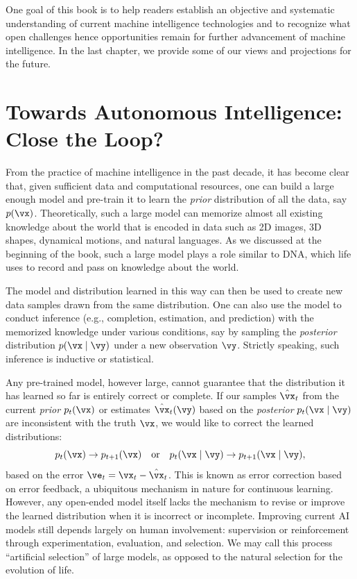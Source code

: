 \documentclass[../../book-main.tex]{subfiles}
\begin{document}
One goal of this book is to help readers establish an objective and
systematic understanding of current machine intelligence technologies
and to recognize what open challenges hence opportunities remain for further
advancement of machine intelligence. In the last chapter, we provide
some of our views and projections for the future.

\section{Towards Autonomous Intelligence: Close the Loop?}
From the practice of machine intelligence in the past decade, it has
become clear that, given sufficient data and computational resources,
one can build a large enough model and pre-train it to learn the
\textit{prior} distribution of all the data, say \(p(\vx)\).
Theoretically, such a large model can memorize almost all existing
knowledge about the world that is encoded in data such as 2D images,
3D shapes, dynamical motions, and natural languages. As we discussed
at the beginning of the book, such a large model plays a role similar
to DNA, which life uses to record and pass on knowledge about the world.

The model and distribution learned in this way can then be used to
create new data samples drawn from the same distribution. One can
also use the model to conduct inference (e.g., completion,
estimation, and prediction) with the memorized knowledge under
various conditions, say by sampling the \textit{posterior}
distribution \(p(\vx\mid \vy)\) under a new observation \(\vy\).
Strictly speaking, such inference is inductive or statistical.

Any pre-trained model, however large, cannot guarantee that the
distribution it has learned so far is entirely correct or complete.
If our samples \(\hat{\vx}_{t}\) from the current \textit{prior}
\(p_{t}(\vx)\) or estimates \(\hat{\vx}_{t}(\vy)\) based on the
\textit{posterior} \(p_{t}(\vx\mid \vy)\) are inconsistent with the
truth \(\vx\), we would like to correct the learned distributions:
\begin{equation}
    p_{t}(\vx) \rightarrow p_{t+1}(\vx) \quad \text{or}\quad
    p_{t}(\vx\mid \vy) \rightarrow p_{t+1}(\vx\mid \vy),
\end{equation}
based on the error \(\ve_{t} = \vx_{t} - \hat{\vx}_{t}\). This is
known as error correction based on error feedback, a ubiquitous
mechanism in nature for continuous learning. However, any open-ended
model itself lacks the mechanism to revise or improve the learned
distribution when it is incorrect or incomplete. Improving current AI
models still depends largely on human involvement: supervision or
reinforcement through experimentation, evaluation, and selection. We
may call this process ``artificial selection'' of large models, as
opposed to the natural selection for the evolution of life.
\end{document}
